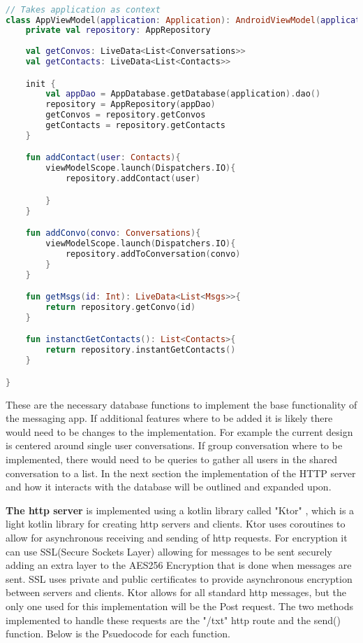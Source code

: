 \documentclass[../main/main.tex]{subfiles}
\begin{document}
\begin{lstlisting}[caption={Example of Viewmodel definition.}, label={lst:example4}, language=Kotlin]

// Takes application as context
class AppViewModel(application: Application): AndroidViewModel(application) {
    private val repository: AppRepository
	
    val getConvos: LiveData<List<Conversations>>
    val getContacts: LiveData<List<Contacts>>

    init {
        val appDao = AppDatabase.getDatabase(application).dao()
        repository = AppRepository(appDao)
        getConvos = repository.getConvos
        getContacts = repository.getContacts
    }

    fun addContact(user: Contacts){
        viewModelScope.launch(Dispatchers.IO){
            repository.addContact(user)

        }
    }

    fun addConvo(convo: Conversations){
        viewModelScope.launch(Dispatchers.IO){
            repository.addToConversation(convo)
        }
    }

    fun getMsgs(id: Int): LiveData<List<Msgs>>{
        return repository.getConvo(id)
    }

    fun instanctGetContacts(): List<Contacts>{
        return repository.instantGetContacts()
    }

}
\end{lstlisting}

These are the necessary database functions to implement the base functionality of the messaging app. 
If additional features where to be added it is likely there would need to be changes to the implementation. 
For example the current design is centered around single user conversations. If group conversation where to be implemented, there would need to be queries to gather all users in the shared conversation to a list. 
In the next section the implementation of the HTTP server and how it interacts with the database will be outlined and expanded upon. 


\textbf{The http server} is implemented using a kotlin library called "Ktor" \cite{KTOR}, which is a light kotlin library for creating http servers and clients. 
Ktor uses coroutines to allow for asynchronous receiving and sending of http requests. 
For encryption it can use SSL(Secure Sockets Layer) allowing for messages to be sent securely adding an extra layer to the AES256 Encryption that is done when messages are sent. 
SSL uses private and public certificates to provide asynchronous encryption between servers and clients. 
Ktor allows for all standard http messages, but the only one used for this implementation will be the Post request. 
The two methods implemented to handle these requests are the "/txt" http route and the send() function.
Below is the Psuedocode for each function.
\end{document}
